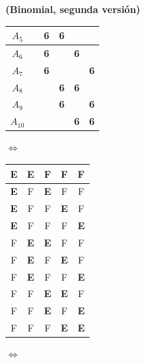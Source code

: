 \begin{Ejemplo}{\bf (Binomial, segunda versión)}
\begin{table}[htbp]
\begin{center}
\begin{tabular}{|c|c|c|c|c|c|}
            \hline
            $A_5$ &  \rule{0cm}{0.5cm}&\mbox{\large\bf 6}& \mbox{\large\bf 6}& & \\
            \hline
            $A_6$ &  \rule{0cm}{0.5cm}&\mbox{\large\bf 6}& &\mbox{\large\bf 6} & \\
            \hline
            $A_7$ &  \rule{0cm}{0.5cm}&\mbox{\large\bf 6}& & & \mbox{\large\bf 6}\\
            \hline
            $A_8$ &  \rule{0cm}{0.5cm}&& \mbox{\large\bf 6}&\mbox{\large\bf 6} & \\
             \hline
            $A_9$ &  \rule{0cm}{0.5cm}&& \mbox{\large\bf 6}& & \mbox{\large\bf 6} \\
             \hline
            $A_{10}$ &  \rule{0cm}{0.5cm}&&& \mbox{\large\bf 6}& \mbox{\large\bf 6} \\
             \hline
             \end{tabular}
             $\Leftrightarrow$
         \begin{tabular}{|c|c|c|c|c|}
            \hline
         \rule{0cm}{0.5cm}\mbox{\large\bf E}&\mbox{\large\bf E}&F & F&F \\
            \hline
             \rule{0cm}{0.5cm}\mbox{\large\bf E}&F& \mbox{\large\bf E}&F &F \\
            \hline
            \rule{0cm}{0.5cm}\mbox{\large\bf E}&F&F &\mbox{\large\bf E} & F\\
            \hline
           \rule{0cm}{0.5cm}\mbox{\large\bf E}&F&F & F&\mbox{\large\bf E} \\
            \hline
             \rule{0cm}{0.5cm}F&\mbox{\large\bf E}& \mbox{\large\bf E}&F & F\\
            \hline
            \rule{0cm}{0.5cm}F&\mbox{\large\bf E}&F &\mbox{\large\bf E} & F\\
            \hline
            \rule{0cm}{0.5cm}F&\mbox{\large\bf E}&F &F & \mbox{\large\bf E}\\
            \hline
            \rule{0cm}{0.5cm}F&F& \mbox{\large\bf E}&\mbox{\large\bf E} &F \\
             \hline
             \rule{0cm}{0.5cm}F&F& \mbox{\large\bf E}& F & \mbox{\large\bf E} \\
             \hline
             \rule{0cm}{0.5cm}F&F&F& \mbox{\large\bf E}& \mbox{\large\bf E} \\
             \hline
             \end{tabular}
                    $\Leftrightarrow$
         \begin{tabular}{|c|c|c|c|c|}

\end{tabular}
\end{center}
\end{table}
\end{Ejemplo}

